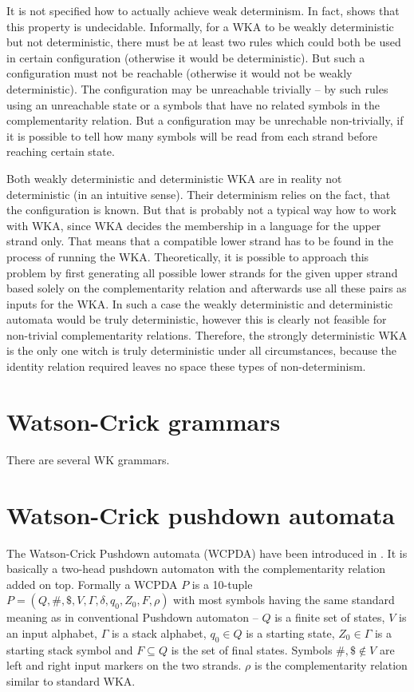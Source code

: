 It is not specified how to actually achieve weak determinism. In fact, \cite{DETERM_WKA} shows that this property is undecidable. Informally, for a WKA to be weakly deterministic but not deterministic, there must be at least two rules which could both be used in certain configuration (otherwise it would be deterministic). But such a configuration must not be reachable (otherwise it would not be weakly deterministic). The configuration may be unreachable trivially -- by such rules using an unreachable state or a symbols that have no related symbols in the complementarity relation. But a configuration may be unrechable non-trivially, if it is possible to tell how many symbols will be read from each strand before reaching certain state.

Both weakly deterministic and deterministic WKA are in reality not deterministic (in an intuitive sense). Their determinism relies on the fact, that the configuration is known. But that is probably not a typical way how to work with WKA, since WKA decides the membership in a language for the upper strand only. That means that a compatible lower strand has to be found in the process of running the WKA. Theoretically, it is possible to approach this problem by first generating all possible lower strands for the given upper strand based solely on the complementarity relation and afterwards use all these pairs as inputs for the WKA. In such a case the weakly deterministic and deterministic automata would be truly deterministic, however this is clearly not feasible for non-trivial complementarity relations. Therefore, the strongly deterministic WKA is the only one witch is truly deterministic under all circumstances, because the identity relation required leaves no space these types of non-determinism.

\section{Watson-Crick grammars}
There are several WK grammars.


\section{Watson-Crick pushdown automata}
The Watson-Crick Pushdown automata (WCPDA) have been introduced in \cite{WK_PUSHDOWN_AUT}. It is basically a two-head pushdown automaton with the complementarity relation added on top. Formally a WCPDA $P$ is a 10-tuple $P = (Q, \#, \$, V, \Gamma, \delta, q_0, Z_0, F, \rho)$ with most symbols having the same standard meaning as in conventional Pushdown automaton -- $Q$ is a finite set of states, $V$ is an input alphabet, $\Gamma$ is a stack alphabet, $q_0 \in Q$ is a starting state, $Z_0 \in \Gamma$ is a starting stack symbol and $F \subseteq Q$ is the set of final states. Symbols $\#, \$ \notin V$ are left and right input markers on the two strands. $\rho$ is the complementarity relation similar to standard WKA.

